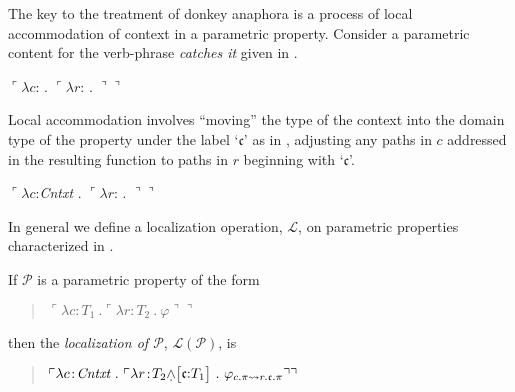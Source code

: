 The key to the treatment of donkey anaphora is a process of local
accommodation of context in a parametric property.  Consider a
parametric content for the verb-phrase \textit{catches it} given in
\nexteg{}.
\begin{ex} 
  $\ulcorner\lambda c$: .
  $\ulcorner\lambda r$: .
  $\urcorner\urcorner$
\end{ex} 
Local accommodation involves ``moving'' the type of the context into
the domain type of the property under the label `$\mathfrak{c}$' as in
\nexteg{}, adjusting any paths in $c$ addressed in the resulting
function to paths in $r$ beginning with `$\mathfrak{c}$'.
\begin{ex} 
 $\ulcorner\lambda c$:\textit{Cntxt} .
  $\ulcorner\lambda r$: .
  $\urcorner\urcorner$
\label{ex:catch-it-localized}
\end{ex}
In general we define a localization operation, $\mathcal{L}$, on
parametric properties characterized in \nexteg{}.
\begin{ex} 
  If $\mathcal{P}$ is a parametric property of the form
  \begin{quote}
    $\ulcorner\lambda c\!:\!T_1\ . \ulcorner\lambda r\!:\!T_2\ .\
    \varphi\urcorner\urcorner$
  \end{quote}
  then the \textit{localization of $\mathcal{P}$},
  $\mathcal{L}(\mathcal{P})$, is
  \begin{quote}
    $\ulcorner\lambda c\!:\!\textit{Cntxt}\ .\ \ulcorner\lambda
    r\!:\!T_2\text{\d{$\wedge$}\smallrecord{
        \smalltfield{$\mathfrak{c}$}{$T_1$}}}\ .\ 
    \varphi_{c.\pi\leadsto r.\mathfrak{c}.\pi}\urcorner\urcorner$
  \end{quote}
\label{ex:localization}  
\end{ex} 
  
